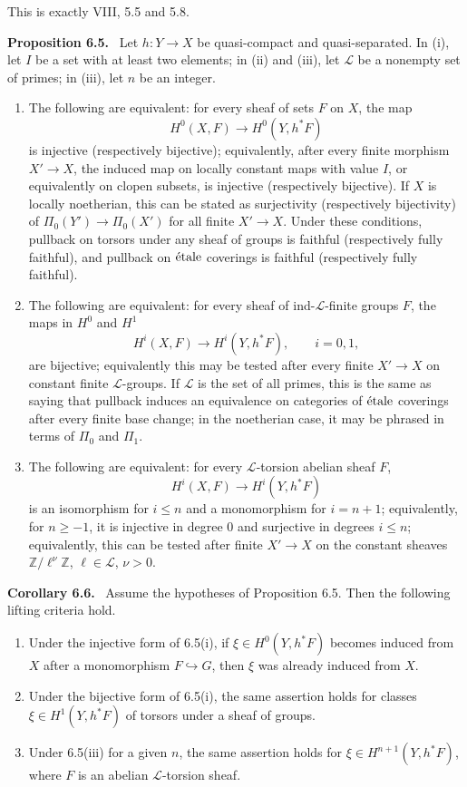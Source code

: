\documentclass[12pt]{article}
\newcommand{\Zz}{\mathbb{Z}}
\newcommand{\LL}{\mathcal L}
\newcommand{\etale}{\ifmmode\textnormal{\'etale}\else\'etale\fi}
\newenvironment{statement}[1]{\par\medskip\noindent\textbf{#1.}\ }{\par\medskip}
\begin{document}
This is exactly VIII, 5.5 and 5.8.

\begin{statement}{Proposition 6.5}
Let \(h:Y\to X\) be quasi-compact and quasi-separated. In (i), let \(I\) be a set with at least two elements; in (ii) and (iii), let \(\LL\) be a nonempty set of primes; in (iii), let \(n\) be an integer.

\begin{enumerate}[label=(\roman*)]
\item The following are equivalent: for every sheaf of sets \(F\) on \(X\), the map
\[
H^0(X,F)\to H^0(Y,h^*F)
\]
is injective (respectively bijective); equivalently, after every finite morphism \(X'\to X\), the induced map on locally constant maps with value \(I\), or equivalently on clopen subsets, is injective (respectively bijective). If \(X\) is locally noetherian, this can be stated as surjectivity (respectively bijectivity) of \(\Pi_0(Y')\to\Pi_0(X')\) for all finite \(X'\to X\). Under these conditions, pullback on torsors under any sheaf of groups is faithful (respectively fully faithful), and pullback on \(\etale\) coverings is faithful (respectively fully faithful).
\item The following are equivalent: for every sheaf of ind-\(\LL\)-finite groups \(F\), the maps in \(H^0\) and \(H^1\)
\[
H^i(X,F)\to H^i(Y,h^*F),\qquad i=0,1,
\]
are bijective; equivalently this may be tested after every finite \(X'\to X\) on constant finite \(\LL\)-groups. If \(\LL\) is the set of all primes, this is the same as saying that pullback induces an equivalence on categories of \(\etale\) coverings after every finite base change; in the noetherian case, it may be phrased in terms of \(\Pi_0\) and \(\Pi_1\).
\item The following are equivalent: for every \(\LL\)-torsion abelian sheaf \(F\),
\[
H^i(X,F)\to H^i(Y,h^*F)
\]
is an isomorphism for \(i\le n\) and a monomorphism for \(i=n+1\); equivalently, for \(n\ge -1\), it is injective in degree \(0\) and surjective in degrees \(i\le n\); equivalently, this can be tested after finite \(X'\to X\) on the constant sheaves \(\Zz/\ell^\nu\Zz\), \(\ell\in\LL\), \(\nu>0\).
\end{enumerate}
\end{statement}

\begin{statement}{Corollary 6.6}
Assume the hypotheses of Proposition 6.5. Then the following lifting criteria hold.
\begin{enumerate}[label=(\roman*)]
\item Under the injective form of 6.5(i), if \(\xi\in H^0(Y,h^*F)\) becomes induced from \(X\) after a monomorphism \(F\hookrightarrow G\), then \(\xi\) was already induced from \(X\).
\item Under the bijective form of 6.5(i), the same assertion holds for classes \(\xi\in H^1(Y,h^*F)\) of torsors under a sheaf of groups.
\item Under 6.5(iii) for a given \(n\), the same assertion holds for \(\xi\in H^{n+1}(Y,h^*F)\), where \(F\) is an abelian \(\LL\)-torsion sheaf.
\end{enumerate}
\end{statement}
\end{document}
